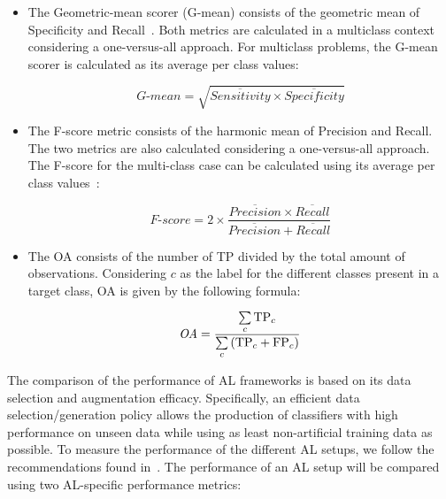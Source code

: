 \documentclass[preprint, 12pt]{elsarticle}
\begin{document}
\begin{itemize}
    \item The Geometric-mean scorer (G-mean) consists of the geometric mean of
        Specificity and Recall~\cite{Kubat1997}. Both metrics are calculated
        in a multiclass context considering a one-versus-all approach. For
        multiclass problems, the G-mean scorer is calculated as its average
        per class values: 
        
        \begin{equation*}
            \textit{G-mean} = \sqrt{\overline{Sensitivity} \times
            \overline{Specificity}}
        \end{equation*}

    \item The F-score metric consists of the harmonic mean of Precision and
        Recall. The two metrics are also calculated considering a
        one-versus-all approach. The F-score for the multi-class case
        can be calculated using its average per class values~\cite{Jeni2013}:

        \begin{equation*}
            \textit{F-score}=2\times\frac{\overline{Precision} \times
            \overline{Recall}}{\overline{Precision} + \overline{Recall}}
        \end{equation*}

    \item The OA consists of the number of TP divided by the total amount of
        observations. Considering $c$ as the label for the different classes
        present in a target class, OA is given by the following formula:

        \begin{equation*}
            \textit{OA} = \frac{\sum\limits_{c}{\text{TP}_{c}}}{%
		    	      \sum\limits_{c}{(\text{TP}_{c}+\text{FP}_{c})}}
        \end{equation*}
\end{itemize}

The comparison of the performance of AL frameworks is based on its data
selection and augmentation efficacy. Specifically, an efficient data
selection/generation policy allows the production of classifiers with high
performance on unseen data while using as least non-artificial training data
as possible. To measure the performance of the different AL setups, we follow
the recommendations found in~\cite{Kottke2017}. The performance of an AL setup
will be compared using two AL-specific performance metrics:
\end{document}
